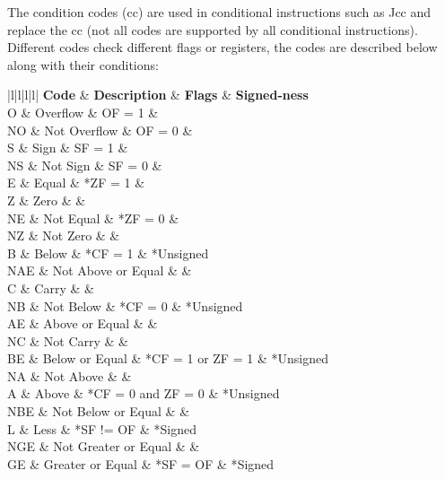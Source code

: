 \documentclass{article}
\newcommand{\layout}[1]{\parbox{\linewidth}{#1}}
\begin{document}
\layout{
  The condition codes (cc) are used in conditional instructions such as Jcc and replace the cc (not all codes are supported by all conditional instructions).
  Different codes check different flags or registers, the codes are described below along with their conditions:

  \begin{table}[H]
    \centering
    \begin{tabular}{|l|l|l|l|}
      \hline \textbf{Code} & \textbf{Description} & \textbf{Flags} & \textbf{Signed-ness} \\ \hline
      O & Overflow & OF = 1 & \\ \hline
      NO & Not Overflow & OF = 0 & \\ \hline
      S & Sign & SF = 1 & \\ \hline
      NS & Not Sign & SF = 0 & \\ \hline
      E & Equal & \multirow{2}*{ZF = 1} & \\ \cline{1-2}
      Z & Zero & & \\ \hline
      NE & Not Equal & \multirow{2}*{ZF = 0} & \\ \cline{1-2}
      NZ & Not Zero & & \\ \hline
      B & Below & \multirow{3}*{CF = 1} & \multirow{3}*{Unsigned} \\ \cline{1-2}
      NAE & Not Above or Equal & & \\ \cline{1-2}
      C & Carry & & \\ \hline
      NB & Not Below & \multirow{3}*{CF = 0} & \multirow{3}*{Unsigned} \\ \cline{1-2}
      AE & Above or Equal & & \\ \cline{1-2}
      NC & Not Carry & & \\ \hline
      BE & Below or Equal & \multirow{2}*{CF = 1 or ZF = 1} & \multirow{2}*{Unsigned} \\ \cline{1-2}
      NA & Not Above & & \\ \hline
      A & Above & \multirow{2}*{CF = 0 and ZF = 0} & \multirow{2}*{Unsigned} \\ \cline{1-2}
      NBE & Not Below or Equal & & \\ \hline
      L & Less & \multirow{2}*{SF != OF} & \multirow{2}*{Signed} \\ \cline{1-2}
      NGE & Not Greater or Equal & & \\ \hline
      GE & Greater or Equal & \multirow{2}*{SF = OF} & \multirow{2}*{Signed} \\ \cline{1-2}

\end{tabular}
\end{table}}
\end{document}
